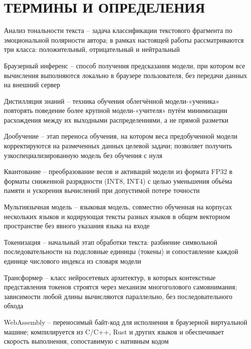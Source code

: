 \chapter*{ТЕРМИНЫ И ОПРЕДЕЛЕНИЯ}

\noindent Анализ тональности текста – задача классификации текстового фрагмента по эмоциональной полярности автора; в рамках настоящей работы рассматриваются три класса: положительный, отрицательный и нейтральный

\noindent Браузерный инференс – способ получения предсказания модели, при котором все вычисления выполняются локально в браузере пользователя, без передачи данных на внешний сервер

\noindent Дистилляция знаний – техника обучения облегчённой модели-«ученика» повторять поведение более крупной модели-«учителя» путём минимизации расхождения между их выходными распределениями, а не прямой разметки

\noindent Дообучение – этап переноса обучения, на котором веса предобученной модели корректируются на размеченных данных целевой задачи; позволяет получить узкоспециализированную модель без обучения с нуля

\noindent Квантование – преобразование весов и активаций модели из формата FP32 в форматы сниженной разрядности (INT8, INT4) с целью уменьшения объёма памяти и ускорения вычислений при допустимой потере точности

\noindent Мультиязычная модель – языковая модель, совместно обученная на корпусах нескольких языков и кодирующая тексты разных языков в общем векторном пространстве без явного указания языка на входе

\noindent Токенизация – начальный этап обработки текста: разбиение символьной последовательности на подсловные единицы (токены) и сопоставление каждой единице числового индекса из словаря модели

\noindent Трансформер – класс нейросетевых архитектур, в которых контекстные представления токенов строятся через механизм многоголового самовнимания; зависимости любой длины вычисляются параллельно, без последовательного обхода

\noindent WebAssembly – переносимый байт-код для исполнения в браузерной виртуальной машине; компилируется из C/C++, Rust и других языков и обеспечивает скорость выполнения, сопоставимую с нативным кодом